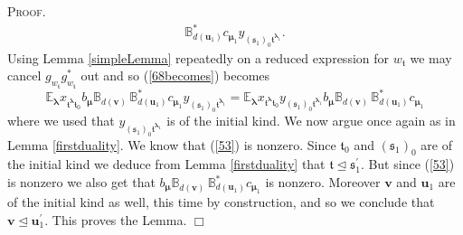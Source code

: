 \documentclass[10pt,a4,twoside,hidelinks,rm]{article}
\newcommand{\BB}{\mathbb{B}}
\newcommand\bu{\mathbf{u}}
\newcommand\bv{\mathbf{v}}
\newcommand{\bT}{\pmb{\mathfrak{t}}}
\newcommand{\Bs}{\pmb{\mathfrak{s}}}
\newcommand\blambda{{\boldsymbol\lambda}}
\newcommand\be{\mathbb{E}}
\newcommand\bmu{{\boldsymbol\mu}}
\theoremstyle{plain}
\newenvironment{demo}
{\textsc{Proof.}} {\quad \hfill $\Box$}
\begin{document}
\begin{demo}
\begin{equation}
\begin{split}
\BB_{d(\bu_1)}^{\ast} c^{}_{\bmu_1}  
y^{}_{  (\Bs_1)_0   \bT^{\blambda_1 }}.
\end{split}
\end{equation}
Using Lemma {\ref{simpleLemma}} repeatedly on a reduced expression for $  w_{\bT}  $
we may cancel $  g^{}_{  w_{\bT} } g^{\ast}_{  w_{\bT} }   $ out and so (\ref{68becomes})
becomes 
\begin{equation}\label{53}
{ \be}^{}_{\blambda}     x^{}_{\bT^{\blambda}  \bT_0} b^{}_{\bmu}\BB^{}_{d(\bv)}  \,
\BB_{d(\bu_1)}^{\ast} c^{}_{\bmu_1}  
y^{}_{  (\Bs_1)_0   \bT^{\blambda_1 }} =
{ \be}^{}_{\blambda}     x_{\bT^{\blambda}  \bT_0} y_{  (\Bs_1)_0   \bT^{\blambda_1 }}
b^{}_{\bmu}\BB^{}_{d(\bv)}  \,
\BB_{d(\bu_1)}^{\ast} c^{}_{\bmu_1}
\end{equation}
where we used that $  y^{}_{  (\Bs_1)_0   \bT^{\blambda_1 }} $ is of the initial kind. 
We now argue once again as in Lemma {\ref{firstduality}}.
We know that (\ref{53}) is nonzero. 
Since $ \bT_0 $ and $ (\Bs_1)_0 $ are of the initial kind we 
deduce from Lemma \ref{firstduality}
that $ \bT \unlhd \Bs_1^{\prime} $. But since (\ref{53}) is nonzero we also get that 
$   b^{}_{\bmu}\BB^{}_{d(\bv)}  \,
\BB_{d(\bu_1)}^{\ast}  
 c^{}_{\bmu_1} $ is nonzero. Moreover
$ \bv $ and $ \bu_1 $ are of the initial kind as well, this time by construction, and so we conclude that 
$ \bv \unlhd \bu_1^{\prime} $. This proves the Lemma.
\end{demo}

\end{document}
